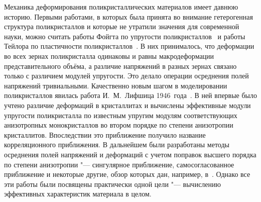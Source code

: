 Механика деформирования поликристаллических материалов имеет
давнюю историю. Первыми работами, в которых была принята во
внимание гетерогенная структура поликристаллов и которые не
утратили значения для современной науки, можно считать работы
Фойгта по упругости поликристаллов~\cite{tashk:bib1} и работы
Тейлора по пластичности поликристаллов~\cite{tashk:bib2}. В них
принималось, что деформации во всех зернах поликристалла одинаковы
и равны макродеформации представительного объёма, а различие
напряжений в разных зернах связано только с различием модулей
упругости. Это делало операции осреднения полей напряжений
тривиальными. Качественно новым шагом в моделировании
поликристаллов явилась работа И.~М.~Лифшица 1946~года~\cite{tashk:bib3}. В ней впервые было учтено различие
деформаций в кристаллитах и вычислены эффективные модули упругости
поликристалла по известным упругим модулям соответствующих
анизотропных монокристаллов во втором порядке по степени
анизотропии кристаллитов. Впоследствии это приближение получило
название корреляционного приближения. В дальнейшем были
разработаны методы осреднения полей напряжений и деформаций с
учетом поправок высшего порядка по степени анизотропии "---
сингулярное приближение, самосогласованное приближение и некоторые
другие, обзор которых дан, например, в~\cite{tashk:bib4}. Однако
все эти работы были посвящены практически одной цели "---
вычислению эффективных характеристик материала в целом.

